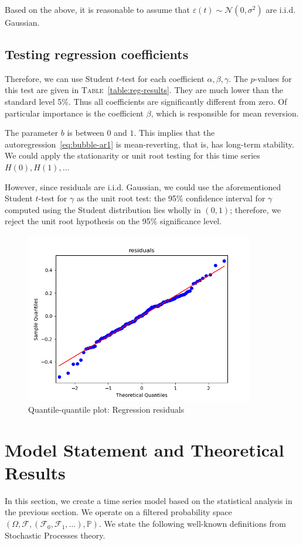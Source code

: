 \documentclass[12pt]{amsart}
\theoremstyle{definition}
\begin{document}
Based on the above, it is reasonable to assume that $\varepsilon(t) \sim \mathcal N(0, \sigma^2)$ are i.i.d. Gaussian. 

\subsection{Testing regression coefficients} Therefore, we can use Student $t$-test for each coefficient $\alpha, \beta, \gamma$. The $p$-values for this test are given in \textsc{Table}~\ref{table:reg-results}. They are much lower than the standard level 5\%. Thus all coefficients are significantly different from zero. Of particular importance is the coefficient $\beta$, which is responsible for mean reversion. 

The parameter $b$ is between $0$ and $1$. This implies that the autoregression~\eqref{eq:bubble-ar1} is mean-reverting, that is, has long-term stability. We could apply the stationarity or unit root testing for this time series $H(0), H(1), \ldots$ 

However, since residuals are i.i.d. Gaussian, we could use the aforementioned Student $t$-test for $\gamma$ as the unit root test: the 95\% confidence interval for $\gamma$ computed using the Student distribution lies wholly in $(0, 1)$; therefore, we reject the unit root hypothesis on the 95\% significance level. 

\begin{figure}[t]
\includegraphics[width = 10cm]{qq-res.png}
\caption{Quantile-quantile plot: Regression residuals}
\label{fig:qq-res}
\end{figure}

\section{Model Statement and Theoretical Results} In this section, we create a time series model based on the statistical analysis in the previous section. We operate on a filtered probability space $(\Omega, \mathcal F, (\mathcal F_0, \mathcal F_1, \ldots), \mathbb P)$. We state the following well-known definitions from Stochastic Processes theory.
\end{document}
